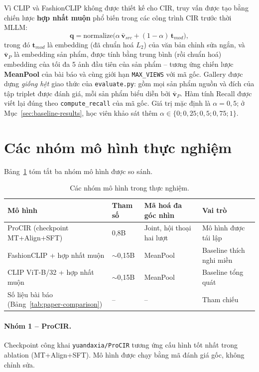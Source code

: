 Vì CLIP và FashionCLIP không được thiết kế cho CIR, truy vấn được tạo bằng chiến lược \textbf{hợp nhất muộn} phổ biến trong các công trình CIR trước thời MLLM:
\begin{equation}
    \mathbf{q} = \mathrm{normalize}\big(\alpha\, \bar{\mathbf{v}}_{src} + (1 - \alpha)\, \mathbf{t}_{mod}\big),
    \label{eq:late-fusion}
\end{equation}
trong đó $\mathbf{t}_{mod}$ là embedding (đã chuẩn hoá $L_2$) của văn bản chỉnh sửa ngắn, và $\bar{\mathbf{v}}_{P}$ là embedding sản phẩm, được tính bằng trung bình (rồi chuẩn hoá) embedding của tối đa 5 ảnh đầu tiên của sản phẩm -- tương ứng chiến lược \textbf{MeanPool} của bài báo và cùng giới hạn \texttt{MAX\_VIEWS} với mã gốc. Gallery được dựng \emph{giống hệt} giao thức của \texttt{evaluate.py}: gồm mọi sản phẩm nguồn và đích của tập triplet được đánh giá, mỗi sản phẩm biểu diễn bởi $\bar{\mathbf{v}}_P$. Hàm tính Recall được viết lại đúng theo \texttt{compute\_recall} của mã gốc. Giá trị mặc định là $\alpha = 0{,}5$; ở Mục~\ref{sec:baseline-results}, học viên khảo sát thêm $\alpha \in \{0; 0{,}25; 0{,}5; 0{,}75; 1\}$.

\section{Các nhóm mô hình thực nghiệm}\label{sec:model-groups}

Bảng~\ref{tab:model-groups} tóm tắt ba nhóm mô hình được so sánh.

\begin{table}[h]
\centering
\caption{Các nhóm mô hình trong thực nghiệm.}
\label{tab:model-groups}
\small
\begin{tabular}{p{3.3cm}p{2.2cm}p{3.4cm}p{4.2cm}}
\toprule
Mô hình & Tham số & Mã hoá đa góc nhìn & Vai trò \\
\midrule
ProCIR (checkpoint MT+Align+SFT) & 0,8B & Joint, hội thoại hai lượt & Mô hình được tái lập \\
FashionCLIP + hợp nhất muộn & $\sim$0,15B & MeanPool & Baseline thích nghi miền \\
CLIP ViT-B/32 + hợp nhất muộn & $\sim$0,15B & MeanPool & Baseline tổng quát \\
Số liệu bài báo (Bảng~\ref{tab:paper-comparison}) & -- & -- & Tham chiếu \\
\bottomrule
\end{tabular}
\end{table}

\paragraph{Nhóm 1 -- ProCIR.} Checkpoint công khai \texttt{yuandaxia/ProCIR} tương ứng cấu hình tốt nhất trong ablation (MT+Align+SFT). Mô hình được chạy bằng mã đánh giá gốc, không chỉnh sửa.

